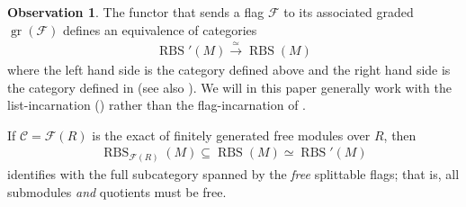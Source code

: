 \documentclass[12pt, reqno]{amsart}
\theoremstyle{plain}
\theoremstyle{definition}
\newtheorem{observation}[theorem]{Observation}
\begin{document}
\begin{observation}\label{compare flag and list version of RBS}
The functor that sends a flag $\mathcal{F}$ to its associated graded $\operatorname{gr}(\mathcal{F})$ defines an equivalence of categories
\begin{align*}
\operatorname{RBS}'(M)\xrightarrow{\simeq} \operatorname{RBS}(M)
\end{align*}
where the left hand side is the category defined above and the right hand side is the category defined in  (see also \cite[Remark 7.18]{ClausenOrsnesJansen}). We will in this paper generally work with the list-incarnation () rather than the flag-incarnation of .

If $\mathcal{C}=\mathcal{F}(R)$ is the exact of finitely generated free modules over $R$, then 
\begin{align*}
\operatorname{RBS}_{\mathcal{F}(R)}(M)\subseteq \operatorname{RBS}(M)\simeq \operatorname{RBS}'(M)
\end{align*}
identifies with the full subcategory spanned by the \textit{free} splittable flags; that is, all submodules \textit{and} quotients must be free.
\end{observation}
\end{document}
